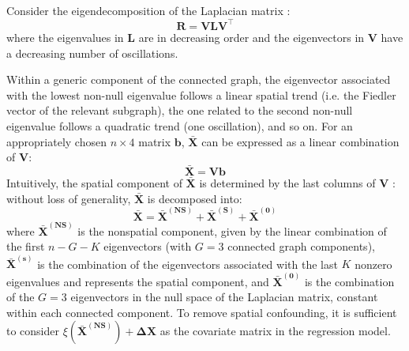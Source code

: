 \documentclass{book}
\begin{document}
Consider the eigendecomposition of the Laplacian matrix \citep{Urdangarin24}: 
$$
\mathbf{R} = \mathbf{VLV}^{\top}
$$
where the eigenvalues in $\mathbf{L}$ are in decreasing order and the eigenvectors in $\mathbf{V}$ have a decreasing number of oscillations. 

Within a generic component of the connected graph, the eigenvector associated with the lowest non-null eigenvalue follows a linear spatial trend (i.e. the Fiedler vector of the relevant subgraph), the one related to the second non-null eigenvalue follows a quadratic trend (one oscillation), and so on.
For an appropriately chosen $n \times 4$ matrix $\mathbf{b}$, $\mathbf{\bar{X}}$ can be expressed as a linear combination of $\mathbf{V}$:
$$
\mathbf{\bar{X}} = \mathbf{Vb}
$$
Intuitively, the spatial component of $\mathbf{\bar{X}}$ is determined by the last columns of $\mathbf{V}$ \citep{Urdangarin24}: without loss of generality, $\mathbf{\bar{X}}$ is decomposed into:
$$
\mathbf{\bar{X} }= \mathbf{\bar{X}^{(NS)}} + \mathbf{\bar{X}^{(S)}} +\mathbf{ \bar{X}^{(0)}}
$$
where $\mathbf{\bar{X}^{(NS)}}$ is the nonspatial component, given by the linear combination of the first $n-G-K$ eigenvectors (with $G=3$ connected graph components), $\mathbf{\bar{X}^{(s)}}$ is the combination of the eigenvectors associated with the last $K$ nonzero eigenvalues and represents the spatial component, and $\mathbf{\bar{X}^{(0)}}$ is the combination of the $G=3$ eigenvectors in the null space of the Laplacian matrix, constant within each connected component. 
To remove spatial confounding, it is sufficient to consider $\xi \left(\mathbf{\bar{X}^{(NS)}} \right) + \mathbf{ \Delta X}$ as the covariate matrix in the regression model. 


\end{document}
